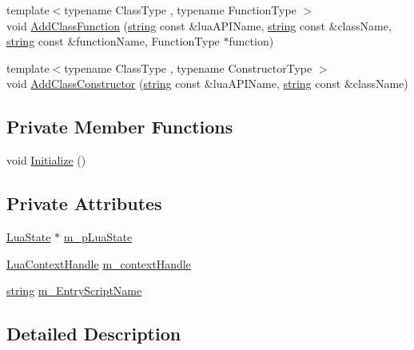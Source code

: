 \begin{DoxyCompactItemize}
\item 
{\footnotesize template$<$typename Class\+Type , typename Function\+Type $>$ }\\void \hyperlink{class_lua_context_a5ecfe4ea3593baa1360ef66329c92182}{Add\+Class\+Function} (\hyperlink{_types_8h_ad453f9f71ce1f9153fb748d6bb25e454}{string} const \&lua\+A\+P\+I\+Name, \hyperlink{_types_8h_ad453f9f71ce1f9153fb748d6bb25e454}{string} const \&class\+Name, \hyperlink{_types_8h_ad453f9f71ce1f9153fb748d6bb25e454}{string} const \&function\+Name, Function\+Type $\ast$function)
\item 
{\footnotesize template$<$typename Class\+Type , typename Constructor\+Type $>$ }\\void \hyperlink{class_lua_context_a701fdb781a1dd49cf700a9c0ec4e8393}{Add\+Class\+Constructor} (\hyperlink{_types_8h_ad453f9f71ce1f9153fb748d6bb25e454}{string} const \&lua\+A\+P\+I\+Name, \hyperlink{_types_8h_ad453f9f71ce1f9153fb748d6bb25e454}{string} const \&class\+Name)
\end{DoxyCompactItemize}
\subsection*{Private Member Functions}
\begin{DoxyCompactItemize}
\item 
void \hyperlink{class_lua_context_a8a84da210d5264402377c149dbe9774e}{Initialize} ()
\end{DoxyCompactItemize}
\subsection*{Private Attributes}
\begin{DoxyCompactItemize}
\item 
\hyperlink{_lua_context_8h_a805a48dbd6fa75acf2f23e35a426e325}{Lua\+State} $\ast$ \hyperlink{class_lua_context_a96ad96f37f625e4a5ca50368ce22a47b}{m\+\_\+p\+Lua\+State}
\item 
\hyperlink{_lua_context_8h_a2ffcc2d3ed21165072a1d7b61259bf14}{Lua\+Context\+Handle} \hyperlink{class_lua_context_a69bdee3a44a0267e554bb50dd9c1e988}{m\+\_\+context\+Handle}
\item 
\hyperlink{_types_8h_ad453f9f71ce1f9153fb748d6bb25e454}{string} \hyperlink{class_lua_context_a3308a35d8225e9af88307ae7c4aec1f4}{m\+\_\+\+Entry\+Script\+Name}
\end{DoxyCompactItemize}


\subsection{Detailed Description}


